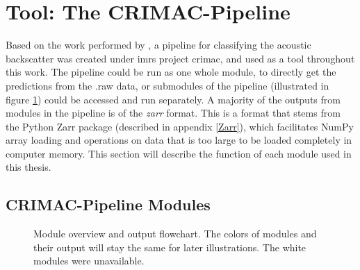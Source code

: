     \section{Tool: The CRIMAC-Pipeline}
        Based on the work performed by \citeauthor{brautaset2020acoustic}\cite{brautaset2020acoustic}, a pipeline for classifying the acoustic backscatter was created under \gls{imr}s project \gls{crimac}\cite{crimac_pipeline}, and used as a tool throughout this work. The pipeline could be run as one whole module, to directly get the predictions from the .raw data, or submodules of the pipeline (illustrated in figure \ref{Module_overview_fig}) could be accessed and run separately. A majority of the outputs from modules in the pipeline is of the \textit{zarr} format. This is a format that stems from the Python Zarr package (described in appendix \ref{Zarr}), which facilitates NumPy array loading and operations on data that is too large to be loaded completely in computer memory. This section will describe the function of each module used in this thesis.
        
            \subsection{CRIMAC-Pipeline Modules} \label{CRIMAC-pipeline}
              \begin{figure}[H]
                \centering
                
                \caption[Module overview]{Module overview and output flowchart. The colors of modules and  their output will stay the same for later illustrations. The white modules were unavailable.}
              	\medskip 
                \label{Module_overview_fig}
            \end{figure}

